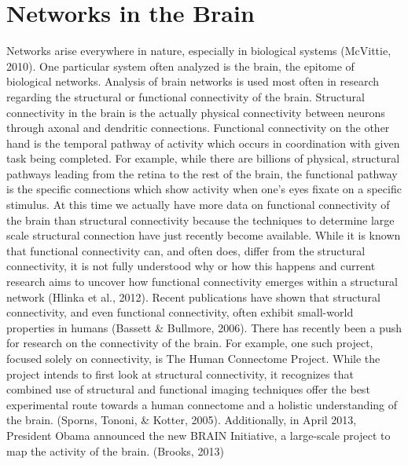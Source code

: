 \documentclass[12pt,letterpaper]{report}
\begin{document}
\section{Networks in the Brain}
	Networks arise everywhere in nature, especially in biological systems (McVittie, 2010). One particular system often analyzed is the brain, the epitome of biological networks. Analysis of brain networks is used most often in research regarding the structural or functional connectivity of the brain. Structural connectivity in the brain is the actually physical connectivity between neurons through axonal and dendritic connections. Functional connectivity on the other hand is the temporal pathway of activity which occurs in coordination with given task being completed. For example, while there are billions of physical, structural pathways leading from the retina to the rest of the brain, the functional pathway is the specific connections which show activity when one's eyes fixate on a specific stimulus. At this time we actually have more data on functional connectivity of the brain than structural connectivity because the techniques to determine large scale structural connection have just recently become available. While it is known that functional connectivity can, and often does, differ from the structural connectivity, it is not fully understood why or how this happens and current research aims to uncover how functional connectivity emerges within a structural network (Hlinka et al., 2012). Recent publications have shown that structural connectivity, and even functional connectivity, often exhibit small-world properties in humans (Bassett & Bullmore, 2006).
	There has recently been a push for research on the connectivity of the brain. For example, one such project, focused solely on connectivity, is The Human Connectome Project. While the project intends to first look at structural connectivity, it recognizes that combined use of structural and functional imaging techniques offer the best experimental route towards a human connectome and a holistic understanding of the brain. (Sporns, Tononi, & Kotter, 2005). Additionally, in April 2013, President Obama announced the new BRAIN Initiative, a large-scale project to map the activity of the brain. (Brooks, 2013)
\end{document}
